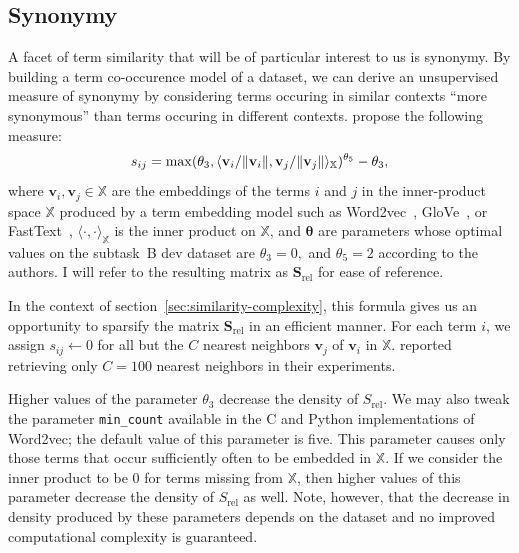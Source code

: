 \documentclass[
  digital, %
  notable, %
  lof,     %
  lot,     %
  nopalatino, color
]{fithesis3}
\begin{document}
\subsection{Synonymy}
A facet of term similarity that will be of particular interest to us is
synonymy. By building a term co-occurence model of a dataset, we can derive
an unsupervised measure of synonymy by considering terms occuring in similar
contexts “more synonymous” than terms occuring in different contexts.
\textcite{charletdamnati17} propose the following measure:\begin{equation}
  s_{ij} = \max(\theta_3, \langle\mathbf v_i / \Vert\mathbf v_i\Vert, \mathbf v_j / \Vert\mathbf v_j\Vert\rangle_{\mathbb X})^{\theta_5} - \theta_3,\index{.h3@$\theta _3$}\index{.h5@$\theta_5$|emph}
\end{equation}
where $\mathbf v_i, \mathbf v_j\in\mathbb X$ are the embeddings of the terms $i$ and $j$ in the inner-product space $\mathbb X$ produced by
a term embedding model such as
Word2vec~\cite{mikolov2013efficient},
GloVe~\cite{pennington2014glove}, or
FastText~\cite{bojanowski2016enriching},
$\langle\cdot,\cdot\rangle_{\mathbb X}$ is the inner product on $\mathbb
X$, and $\bm\theta$ are parameters whose optimal
values on the subtask~B dev dataset are $\theta_3=0,$ and $\theta_5=2$
according to the authors. I will refer to the resulting matrix as $\mathbf
S_{\textrm{rel}}$ for ease of
reference.

In the context of section~\ref{sec:similarity-complexity}, this formula gives
us an opportunity to sparsify the matrix $\mathbf
S_{\textrm{rel}}$ in an efficient
manner. For each term $i$, we assign $s_{ij}\leftarrow 0$ for all but the
$C$ nearest neighbors $\mathbf v_j$ of $\mathbf v_i$ in $\mathbb X$.
\textcite{charletdamnati17} reported retrieving only $C=100$
nearest neighbors in their experiments.

Higher values of the parameter $\theta_3$ decrease the
density of $S_{\textrm{rel}}$. We may
also tweak the parameter
\texttt{min\_count}
available in the C and Python implementations of Word2vec; the
default value of this parameter is five. This parameter causes only those terms
that occur sufficiently often to be embedded in $\mathbb X$.
If we consider the inner product to be $0$ for terms missing from $\mathbb
X$, then higher values of this parameter decrease the
density of $S_{\textrm{rel}}$ as well. Note, however, that the decrease in
density produced by these parameters depends on the dataset and no improved
computational complexity is guaranteed.
\end{document}
